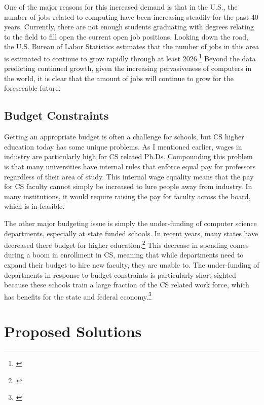 \documentclass[12pt,twoside]{reedthesis}
\begin{document}
One of the major reasons for this increased demand is that in the U.S.,  the number of jobs related to computing have been increasing steadily for the past 40 years. Currently, there are not enough students graduating with degrees relating to the field to fill open the current open job positions. Looking down the road, the U.S. Bureau of Labor Statistics estimates that the number of jobs in this area is estimated to continue to grow rapidly through at least 2026.\footnote{\cite{BLS}} Beyond the data predicting continued growth, given the increasing pervasiveness of computers in the world, it is clear that the amount of jobs will continue to grow for the foreseeable future. 

\subsection{Budget Constraints}
Getting an appropriate budget is often a challenge for schools, but CS higher education today has some unique problems. As I mentioned earlier, wages in industry are particularly high for CS related Ph.Ds. Compounding this problem is that many universities have internal rules that enforce equal pay for professors regardless of their area of study. This internal wage equality means that the pay for CS faculty cannot simply be increased to lure people away from industry. In many institutions, it would require raising the pay for faculty across the board, which is in-feasible. 

The other major budgeting issue is simply the under-funding of computer science departments, especially at state funded schools. In recent years, many states have decreased there budget for higher education.\footnote{\cite{committee_on_the_growth_of_computer_science_undergraduate_enrollments_assessing_2018}}  This decrease in spending comes during a boom in enrollment in CS, meaning that while departments need to expand their budget to hire new faculty, they are unable to. The under-funding of departments in response to budget constraints is particularly short sighted because these schools train a large fraction of the CS related work force, which has benefits for the state and federal economy.\footnote{\cite{committee_on_the_growth_of_computer_science_undergraduate_enrollments_assessing_2018}} 

\section{Proposed Solutions}
\end{document}
